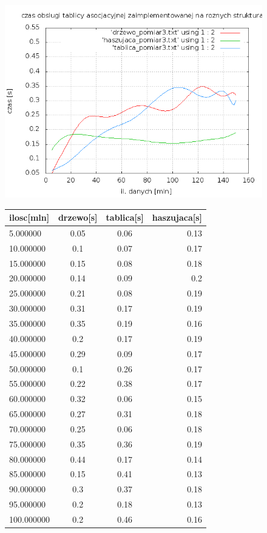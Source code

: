 \documentclass[a4paper,11pt]{report}
\begin{document}
\begin{figure}
    \includegraphics[scale=0.5]{./czas_dzialania_algorytmow3.png}
    \label{fig:}
    \caption{}
       \begin{tabular}{|l|c|c|r|}
\hline
ilosc[mln]&	drzewo[s]&	tablica[s]&	haszujaca[s]\\\hline
5.000000&	0.05&	0.06&	0.13\\
10.000000&	0.1&	0.07&	0.17\\
15.000000&	0.15&	0.08&	0.18\\
20.000000&	0.14&	0.09&	0.2\\
25.000000&	0.21&	0.08&	0.19\\
30.000000&	0.31&	0.17&	0.19\\
35.000000&	0.35&	0.19&	0.16\\
40.000000&	0.2&	0.17&	0.19\\
45.000000&	0.29&	0.09&	0.17\\
50.000000&	0.1&	0.26&	0.17\\
55.000000&	0.22&	0.38&	0.17\\
60.000000&	0.32&	0.06&	0.15\\
65.000000&	0.27&	0.31&	0.18\\
70.000000&	0.25&	0.06&	0.18\\
75.000000&	0.35&	0.36&	0.19\\
80.000000&	0.44&	0.17&	0.14\\
85.000000&	0.15&	0.41&	0.13\\
90.000000&	0.3&	0.37&	0.18\\
95.000000&	0.2&	0.18&	0.13\\
100.000000&	0.2&	0.46&	0.16\\

\end{tabular}
\end{figure}
\end{document}
